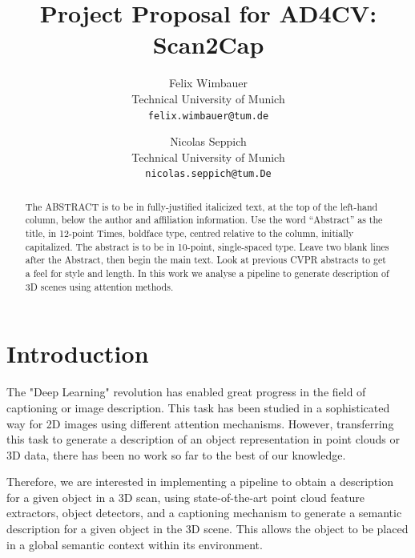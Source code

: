 \documentclass[10pt,twocolumn,letterpaper]{article}
\begin{document}
\title{Project Proposal for AD4CV: Scan2Cap}

\author{Felix Wimbauer\\
Technical University of Munich\\
{\tt\small felix.wimbauer@tum.de}
\and
Nicolas Seppich\\
Technical University of Munich\\
{\tt\small nicolas.seppich@tum.De}
}

\maketitle

\begin{abstract}
   The ABSTRACT is to be in fully-justified italicized text, at the top
   of the left-hand column, below the author and affiliation
   information. Use the word ``Abstract'' as the title, in 12-point
   Times, boldface type, centred relative to the column, initially
   capitalized. The abstract is to be in 10-point, single-spaced type.
   Leave two blank lines after the Abstract, then begin the main text.
   Look at previous CVPR abstracts to get a feel for style and length.
   In this work we analyse a pipeline to generate description of 3D scenes using attention methods. 
   
\end{abstract}

\section{Introduction}

The "Deep Learning" revolution has enabled great progress in the field of captioning or image description. This task has been studied in a sophisticated way for 2D images using different attention mechanisms.
However, transferring this task to generate a description of an object representation in point clouds or 3D data, there has been no work so far to the best of our knowledge.

Therefore, we are interested in implementing a pipeline to obtain a description for a given object in a 3D scan, using state-of-the-art point cloud feature extractors, object detectors, and a captioning mechanism to generate a semantic description for a given object in the 3D scene. This allows the object to be placed in a global semantic context within its environment.
 
\end{document}
